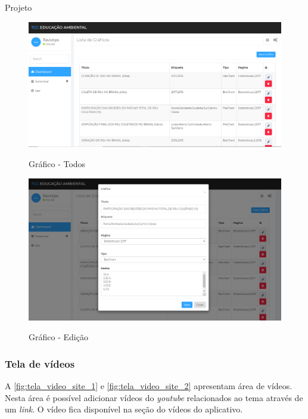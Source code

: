 \documentclass[
	12pt,				%
	openany,			%
	twoside,			%
	a4paper,			%
	english,			%
	french,				%
	spanish,			%
	brazil				%
	]{abntex2}
\begin{document}
\begin{chapter}{Projeto}
\begin{figure}[h]
\centering
   \caption{Gráfico - Todos}
   \includegraphics[scale=0.45]{media/tela_graficos_site_1.png}
     \label{fig:tela_graficos_site_1}
\end{figure}

\begin{figure}[h]
\centering
   \caption{Gráfico - Edição}
   \includegraphics[scale=0.40]{media/tela_graficos_site_2.png}
     \label{fig:tela_graficos_site_2}
\end{figure}

\newpage
\subsubsection{Tela de vídeos} \label{tela_video}
A \autoref{fig:tela_video_site_1} e \autoref{fig:tela_video_site_2} apresentam área de vídeos. Nesta área é possível adicionar vídeos do \textit{youtube} relacionados ao tema através de um \textit{link}. O vídeo fica disponível na seção do vídeos do aplicativo. 


\end{chapter}
\end{document}
